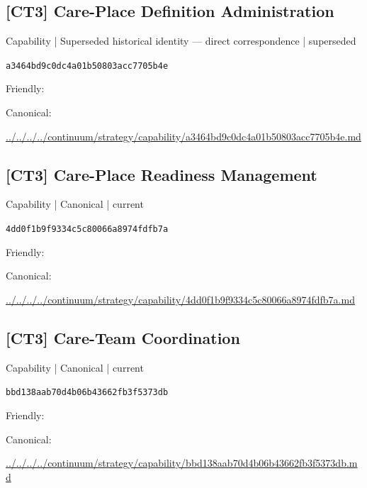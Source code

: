 \documentclass[10pt,a4paper]{article}
\begin{document}
\subsection*{[CT3] Care-Place Definition Administration}
{\small Capability | Superseded historical identity — direct correspondence | superseded}\par
\texttt{a3464bd9c0dc4a01b50803acc7705b4e}\par
Friendly: \par
Canonical: \par
{\footnotesize\url{../../../../continuum/strategy/capability/a3464bd9c0dc4a01b50803acc7705b4e.md}}\par
\subsection*{[CT3] Care-Place Readiness Management}
{\small Capability | Canonical | current}\par
\texttt{4dd0f1b9f9334c5c80066a8974fdfb7a}\par
Friendly: \par
Canonical: \par
{\footnotesize\url{../../../../continuum/strategy/capability/4dd0f1b9f9334c5c80066a8974fdfb7a.md}}\par
\subsection*{[CT3] Care-Team Coordination}
{\small Capability | Canonical | current}\par
\texttt{bbd138aab70d4b06b43662fb3f5373db}\par
Friendly: \par
Canonical: \par
{\footnotesize\url{../../../../continuum/strategy/capability/bbd138aab70d4b06b43662fb3f5373db.md}}\par
\end{document}
